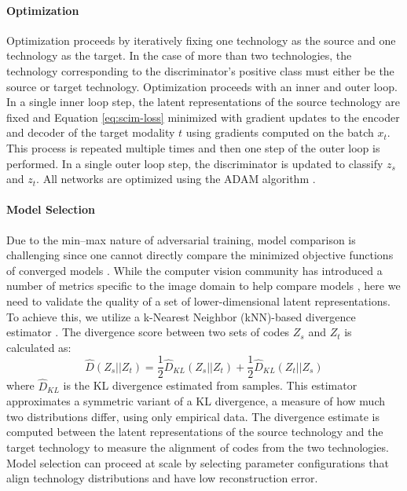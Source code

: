 \paragraph{Optimization}
Optimization proceeds by iteratively fixing one technology as the source and one technology as the target.
In the case of more than two technologies, the technology corresponding to the discriminator’s positive class must either be the source or target technology.
Optimization proceeds with an inner and outer loop.
In a single inner loop step, the latent representations of the source technology are fixed and Equation \ref{eq:scim-loss} minimized with gradient updates to the encoder and decoder of the target modality $t$ using gradients computed on the batch $x_t$.
This process is repeated multiple times and then one step of the outer loop is performed.
In a single outer loop step, the discriminator is updated to classify $z_s$ and $z_t$.
All networks are optimized using the ADAM algorithm \cite{kingma2013}.


\paragraph{Model Selection}
Due to the min–max nature of adversarial training, model comparison is challenging since one cannot directly compare the minimized objective functions of converged models \cite{lucic2017}.
While the computer vision community has introduced a number of metrics specific to the image domain to help compare models \cite{heusel2017,salimans2016}, here we need to validate the quality of a set of lower-dimensional latent representations.
To achieve this, we utilize a k-Nearest Neighbor (kNN)-based divergence estimator \cite{wang2009}.
The divergence score between two sets of codes $Z_s$ and $Z_t$ is calculated as:
\begin{equation}
	\hat{D}(Z_s || Z_t) = \frac{1}{2} \hat{D}_{KL}(Z_s || Z_t) + \frac{1}{2} \hat{D}_{KL}(Z_t || Z_s)
\end{equation}
where $\hat{D}_{KL}$ is the KL divergence estimated from samples.
This estimator approximates a symmetric variant of a KL divergence, a measure of how much two distributions differ, using only empirical data.
The divergence estimate is computed between the latent representations of the source technology and the target technology to measure the alignment of codes from the two technologies.
Model selection can proceed at scale by selecting parameter configurations that align technology distributions and have low reconstruction error.

